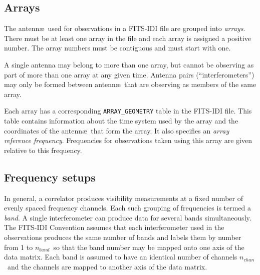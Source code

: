 \documentclass[twoside]{article}
\newcommand{\Hi}[1]{\textcolor{hicol}{#1}}
\newcommand{\nband}{$n_{band}$}
\newcommand{\nchan}{$n_{chan}$}
\begin{document}
\subsection{Arrays}

The antenn\ae\ used for observations in a FITS-IDI file are grouped
into {\it arrays}.  There must be at least one array in the file and
each array is assigned a \Hi{positive} number.  The array numbers must
be contiguous \Hi{and} must start with one.

A single antenna may belong to more than one array, but cannot be
observing as part of more than one array at any given time.
\Hi{Antenna pairs} (``interferometers'') may only be formed between
antenn\ae\ that are observing as members of the same array.

Each array has a corresponding {\tt ARRAY\_GEOMETRY} table in the
FITS-IDI file.  This table contains information about the time system
used by the array and the coordinates of the antenn\ae\ that form the
array.  It also specifies an {\it array reference frequency}.
Frequencies for observations taken using this array are given relative
to this frequency.

\subsection{Frequency setups}
\label{Intr:freq}

In general, a correlator produces visibility measurements at a fixed
number of evenly spaced frequency channels.  Each such grouping of
frequencies is termed a {\it band}.  A single interferometer can
produce data for several bands \Hi{simultaneously}.  The FITS-IDI
\Hi{Convention} assumes that each interferometer used in the
observations produces the same number of bands and labels them by
number from 1 to \nband\ so that the band number may be mapped onto
one axis of the data matrix.  Each band is assumed to have an
identical number of channels \Hi{\nchan}\ and the channels are mapped
to another axis of the data matrix.
\end{document}
